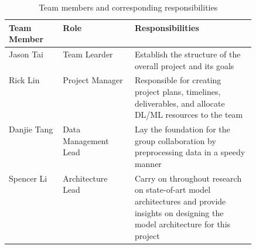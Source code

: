 \documentclass{article} %
\begin{document}
\begin{table}[h]
\centering
\begin{tabular}{|l|l|p{0.49\linewidth}|} \hline
Team Member & Role & Responsibilities \\ \hline
Jason Tai & Team Learder & Establish the structure of the overall project and its goals \\\hline
Rick Lin & Project Manager & Responsible for creating project plans, timelines, deliverables, and allocate DL/ML resources to the team \\ \hline
Danjie Tang & Data Management Lead & Lay the foundation for the group collaboration by preprocessing data in a speedy manner \\ \hline
Spencer Li & Architecture Lead & Carry on throughout research on state-of-art model architectures and provide insights on designing the model architecture for this project \\ \hline
\end{tabular}
\caption{\label{tab:teammember_table} Team members and corresponding responsibilities}
\end{table}
\end{document}
